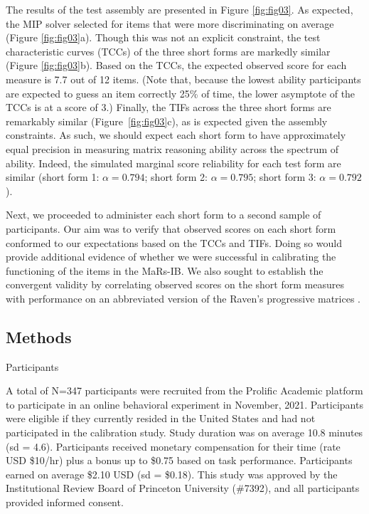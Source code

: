 \documentclass[a4paper,man,natbib]{apa6}
\makeatletter
\renewcommand{\subsubsection}{\@startsection{subsubsection}{3}
  {\z@}%
  {\b@level@two@skip}{\e@level@two@skip}%
  {\normalfont\normalsize\bfseries}}
\makeatother
\begin{document}
The results of the test assembly are presented in Figure \ref{fig:fig03}. As expected, the MIP solver selected for items that were more discriminating on average (Figure \ref{fig:fig03}a). Though this was not an explicit constraint, the test characteristic curves (TCCs) of the three short forms are markedly similar (Figure \ref{fig:fig03}b). Based on the TCCs, the expected observed score for each measure is 7.7 out of 12 items. (Note that, because the lowest ability participants are expected to guess an item correctly 25\% of time, the lower asymptote of the TCCs is at a score of 3.) Finally, the TIFs across the three short forms are remarkably similar (Figure~\ref{fig:fig03}c), as is expected given the assembly constraints. As such, we should expect each short form to have approximately equal precision in measuring matrix reasoning ability across the spectrum of ability. Indeed, the simulated marginal score reliability for each test form are similar (short form 1: $\alpha = 0.794$; short form 2: $\alpha = 0.795$; short form 3: $\alpha = 0.792$). 

Next, we proceeded to administer each short form to a second sample of participants. Our aim was to verify that observed scores on each short form conformed to our expectations based on the TCCs and TIFs. Doing so would provide additional evidence of whether we were successful in calibrating the functioning of the items in the MaRs-IB. We also sought to establish the convergent validity by correlating observed scores on the short form measures with performance on an abbreviated version of the Raven's progressive matrices \citep{bilker2012development}.

\subsection{Methods}

\subsubsection{Participants}

A total of N=347 participants were recruited from the Prolific Academic platform to participate in an online behavioral experiment in November, 2021. Participants were eligible if they currently resided in the United States and had not participated in the calibration study. Study duration was on average 10.8 minutes (sd = 4.6). Participants received monetary compensation for their time (rate USD \$10/hr) plus a bonus up to \$0.75 based on task performance. Participants earned on average \$2.10 USD (sd = \$0.18). This study was approved by the Institutional Review Board of Princeton University (\#7392), and all participants provided informed consent. 
\end{document}
